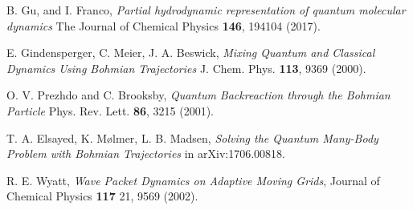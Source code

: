 \documentclass[nofootinbib, secnumarabic, amsmath, nobibnotes,10pt,aps,pra]{revtex4-1}
\begin{document}
\begin{thebibliography}{999}
B. Gu, and I. Franco, \emph{Partial hydrodynamic representation of quantum molecular dynamics} The Journal of Chemical Physics \textbf{146},  194104 (2017).

E. Gindensperger, C. Meier, J. A. Beswick, \emph{Mixing Quantum and Classical Dynamics Using Bohmian Trajectories} J. Chem. Phys. \textbf{113},  9369 (2000).

O. V. Prezhdo and C. Brooksby, \emph{Quantum Backreaction through the Bohmian Particle} Phys. Rev. Lett. \textbf{86},  3215 (2001).

T. A. Elsayed, K. M\o lmer, L. B. Madsen, \emph{Solving the Quantum Many-Body Problem with Bohmian Trajectories} in arXiv:1706.00818.

R. E. Wyatt, \emph{Wave Packet Dynamics on Adaptive Moving Grids}, Journal of Chemical Physics \textbf{117} 21,  9569 (2002).
\end{thebibliography}
\end{document}
